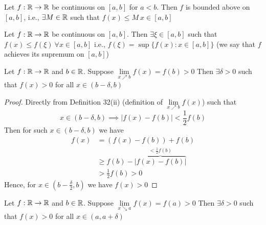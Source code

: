 \begin{theorem}\label{thm:upbndcts}
    Let $f: \mathbb R \rightarrow \mathbb R$ be continuous on $\left[a, b\right]$ for $a < b$.
    Then $f$ is bounded above on $\left[a, b\right]$, i.e., $\exists M \in \mathbb R$ such that $f(x) \leq M\ x \in \left[a, b\right]$
\end{theorem}

\begin{theorem}
    Let $f: \mathbb R \rightarrow \mathbb R$ be continuous on $\left[a, b\right]$.
    Then $\exists \xi \in \left[a, b\right]$ such that $f(x) \leq f(\xi)\ \forall x \in \left[a, b\right]$
    i.e., $f(\xi)=\sup\{f(x): x\in\left[a, b\right]\}$
    (we say that $f$ achieves its supremum on $\left[a, b\right]$)
\end{theorem}

\begin{lemma*}[$35'$]
    Let $f: \mathbb R \rightarrow \mathbb R$ and $b \in \mathbb R$.
    Suppose $\lim\limits_{x \nearrow b} f(x) = f(b) > 0$
    Then $\exists \delta > 0$ such that $f(x) > 0$ for all $x \in (b - \delta, b)$
\end{lemma*}

\begin{proof}
    Directly from Definition 32(ii) (definition of $\lim\limits_{x \nearrow b} f(x)$) such that
    $$x \in (b - \delta, b) \implies |f(x) - f(b)| < \frac{1}{2} f(b)$$
    Then for such $x \in (b - \delta, b)$ we have 
    \begin{align*}
        f(x) &= (f(x) - f(b)) + f(b) \\
        & \geq f(b) - \overbrace{|f(x) - f(b)|}^{<\frac{1}{2}f(b)} \\
        &> \frac{1}{2} f(b) > 0
    \end{align*}
    Hence, for $x \in (b - \frac{\delta}{2}, b)$ we have $f(x) > 0$
\end{proof}

\begin{lemma*}[$35'$]
    Let $f: \mathbb R \rightarrow \mathbb R$ and $b \in \mathbb R$.
    Suppose $\lim\limits_{x \searrow a} f(x) = f(a) > 0$
    Then $\exists \delta > 0$ such that $f(x) > 0$ for all $x \in (a, a + \delta)$
\end{lemma*}

